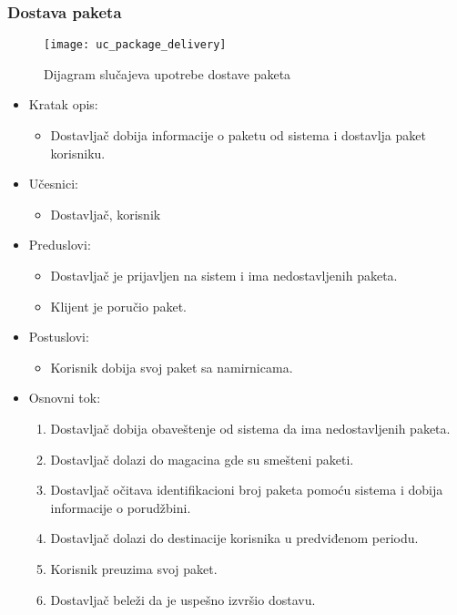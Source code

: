 
\subsubsection{Dostava paketa}
\begin{figure}[H]
	\begin{center}
		\texttt{[image: uc\_package\_delivery]}
	\end{center}
	\caption{Dijagram slučajeva upotrebe dostave paketa}
\end{figure}

	\begin{itemize}
		\item{Kratak opis:} 
		\begin{itemize}
			\item{Dostavljač dobija informacije o paketu od sistema i dostavlja paket korisniku.}
		\end{itemize}
		
		\item{Učesnici:} 
		\begin{itemize}
			\item{Dostavljač, korisnik}
		\end{itemize}		
		
		\item{Preduslovi:}
		\begin{itemize}
			\item{Dostavljač je prijavljen na sistem i ima nedostavljenih paketa. }
			\item{Klijent je poručio paket.}
		\end{itemize}		

		\item{Postuslovi:}
		\begin{itemize}
			\item{Korisnik dobija svoj paket sa namirnicama.}
		\end{itemize}		
		
		\item{Osnovni tok:}
		\begin{enumerate}
			\item{Dostavljač dobija obaveštenje od sistema da ima nedostavljenih paketa.}
			\item{Dostavljač dolazi do magacina gde su smešteni paketi.}
			\item{Dostavljač očitava identifikacioni broj paketa pomoću sistema i dobija informacije o porudžbini.}
			\item{Dostavljač dolazi do destinacije korisnika u predviđenom periodu.}
			\item{Korisnik preuzima svoj paket.}
			\item{Dostavljač beleži da je uspešno izvršio dostavu.}
			

\end{enumerate}
\end{itemize}
